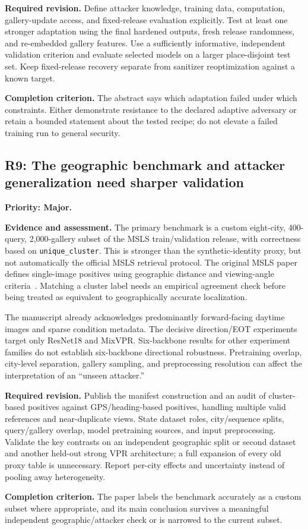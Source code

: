 \documentclass[11pt,a4paper]{article}
\newcommand{\finding}[3]{\subsection{#1: #3}\label{rev:#1}\textbf{Priority: #2.}}
\newcommand{\file}[1]{\nolinkurl{#1}}
\newcommand{\evidence}{\par\textbf{Evidence and assessment.} }
\newcommand{\action}{\par\textbf{Required revision.} }
\newcommand{\acceptance}{\par\textbf{Completion criterion.} }
\begin{document}
\action
Define attacker knowledge, training data, computation, gallery-update access, and fixed-release evaluation explicitly. Test at least one stronger adaptation using the final hardened outputs, fresh release randomness, and re-embedded gallery features. Use a sufficiently informative, independent validation criterion and evaluate selected models on a larger place-disjoint test set. Keep fixed-release recovery separate from sanitizer reoptimization against a known target.
\acceptance
The abstract says which adaptation failed under which constraints. Either demonstrate resistance to the declared adaptive adversary or retain a bounded statement about the tested recipe; do not elevate a failed training run to general security.

\finding{R9}{Major}{The geographic benchmark and attacker generalization need sharper validation}
\evidence
The primary benchmark is a custom eight-city, 400-query, 2,000-gallery subset of the MSLS train/validation release, with correctness based on \file{unique_cluster}. This is stronger than the synthetic-identity proxy, but not automatically the official MSLS retrieval protocol. The original MSLS paper defines single-image positives using geographic distance and viewing-angle criteria~\cite{msls}. Matching a cluster label needs an empirical agreement check before being treated as equivalent to geographically accurate localization.

The manuscript already acknowledges predominantly forward-facing daytime images and sparse condition metadata. The decisive direction/EOT experiments target only ResNet18 and MixVPR. Six-backbone results for other experiment families do not establish six-backbone directional robustness. Pretraining overlap, city-level separation, gallery sampling, and preprocessing resolution can affect the interpretation of an ``unseen attacker.''

\action
Publish the manifest construction and an audit of cluster-based positives against GPS/heading-based positives, handling multiple valid references and near-duplicate views. State dataset roles, city/sequence splits, query/gallery overlap, model pretraining sources, and input preprocessing. Validate the key contrasts on an independent geographic split or second dataset and another held-out strong VPR architecture; a full expansion of every old proxy table is unnecessary. Report per-city effects and uncertainty instead of pooling away heterogeneity.
\acceptance
The paper labels the benchmark accurately as a custom subset where appropriate, and its main conclusion survives a meaningful independent geographic/attacker check or is narrowed to the current subset.
\end{document}
